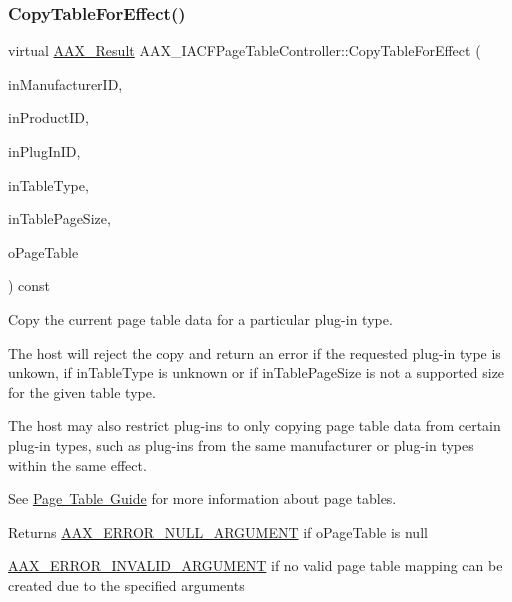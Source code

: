 \subsubsection{\texorpdfstring{CopyTableForEffect()}{CopyTableForEffect()}}
{\footnotesize\ttfamily virtual \mbox{\hyperlink{a00392_a4d8f69a697df7f70c3a8e9b8ee130d2f}{A\+A\+X\+\_\+\+Result}} A\+A\+X\+\_\+\+I\+A\+C\+F\+Page\+Table\+Controller\+::\+Copy\+Table\+For\+Effect (\begin{DoxyParamCaption}\item[{\mbox{\hyperlink{a00392_ab247c0d8686c14e05cbb567ef276f249}{A\+A\+X\+\_\+\+C\+Property\+Value}}}]{in\+Manufacturer\+ID,  }\item[{\mbox{\hyperlink{a00392_ab247c0d8686c14e05cbb567ef276f249}{A\+A\+X\+\_\+\+C\+Property\+Value}}}]{in\+Product\+ID,  }\item[{\mbox{\hyperlink{a00392_ab247c0d8686c14e05cbb567ef276f249}{A\+A\+X\+\_\+\+C\+Property\+Value}}}]{in\+Plug\+In\+ID,  }\item[{uint32\+\_\+t}]{in\+Table\+Type,  }\item[{int32\+\_\+t}]{in\+Table\+Page\+Size,  }\item[{\mbox{\hyperlink{a01409}{I\+A\+C\+F\+Unknown}} $\ast$}]{o\+Page\+Table }\end{DoxyParamCaption}) const\hspace{0.3cm}{\ttfamily [pure virtual]}}

Copy the current page table data for a particular plug-\/in type.

The host will reject the copy and return an error if the requested plug-\/in type is unkown, if {\ttfamily in\+Table\+Type} is unknown or if {\ttfamily in\+Table\+Page\+Size} is not a supported size for the given table type.

The host may also restrict plug-\/ins to only copying page table data from certain plug-\/in types, such as plug-\/ins from the same manufacturer or plug-\/in types within the same effect.

See \mbox{\hyperlink{a00833}{Page Table Guide}} for more information about page tables.

\begin{DoxyReturn}{Returns}
\mbox{\hyperlink{a00494_a5f8c7439f3a706c4f8315a9609811937aa77cf0ad2d545c97b095d8bc19a7c969}{A\+A\+X\+\_\+\+E\+R\+R\+O\+R\+\_\+\+N\+U\+L\+L\+\_\+\+A\+R\+G\+U\+M\+E\+NT}} if {\ttfamily o\+Page\+Table} is null

\mbox{\hyperlink{a00494_a5f8c7439f3a706c4f8315a9609811937a7d27a3bd88231e331c98d85f5b10e2eb}{A\+A\+X\+\_\+\+E\+R\+R\+O\+R\+\_\+\+I\+N\+V\+A\+L\+I\+D\+\_\+\+A\+R\+G\+U\+M\+E\+NT}} if no valid page table mapping can be created due to the specified arguments
\end{DoxyReturn}

